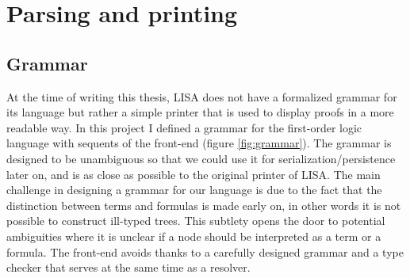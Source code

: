 \section{Parsing and printing}
\label{sec:parsing-printing}

\subsection{Grammar}

At the time of writing this thesis, LISA does not have a formalized grammar for its language but rather a simple printer that is used to display proofs in a more readable way. In this project I defined a grammar for the first-order logic language with sequents of the front-end (figure \ref{fig:grammar}). The grammar is designed to be unambiguous so that we could use it for serialization/persistence later on, and is as close as possible to the original printer of LISA. The main challenge in designing a grammar for our language is due to the fact that the distinction between terms and formulas is made early on, in other words it is not possible to construct ill-typed trees. This subtlety opens the door to potential ambiguities where it is unclear if a node should be interpreted as a term or a formula. The front-end avoids thanks to a carefully designed grammar and a type checker that serves at the same time as a resolver.

